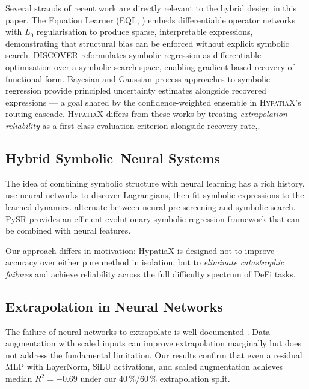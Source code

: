 \documentclass[twoside,11pt]{article}
\newcommand{\Rsq}{R^{2}}
\begin{document}
Several strands of recent work are directly relevant to the hybrid design in
this paper.  The Equation Learner (EQL; \citealt{sahoo2018eql}) embeds
differentiable operator networks with $L_0$ regularisation to produce sparse,
interpretable expressions, demonstrating that structural bias can be enforced
without explicit symbolic search.  DISCOVER \citep{liu2022discover} reformulates
symbolic regression as differentiable optimisation over a symbolic search space,
enabling gradient-based recovery of functional form.  Bayesian and
Gaussian-process approaches to symbolic regression \citep{jin2020bayesian}
provide principled uncertainty estimates alongside recovered expressions ---
a goal shared by the confidence-weighted ensemble in \textsc{HypatiaX}'s
routing cascade.  \textsc{HypatiaX} differs from these works by treating
\emph{extrapolation reliability} as a first-class evaluation criterion
alongside recovery rate,.

\subsection{Hybrid Symbolic--Neural Systems}\label{subsec:hybrid-symbolicneural-systems}
\label{sec:related_hybrid}

The idea of combining symbolic structure with neural learning has a rich history.
\citet{cranmer2020lagrangian} use neural networks to discover Lagrangians, then
fit symbolic expressions to the learned dynamics.  \citet{udrescu2020ai} alternate
between neural pre-screening and symbolic search.  PySR \citep{cranmer2023pysr}
provides an efficient evolutionary-symbolic regression framework that can be
combined with neural features.

Our approach differs in motivation: HypatiaX is designed not to improve accuracy
over either pure method in isolation, but to \emph{eliminate catastrophic failures}
and achieve reliability across the full difficulty spectrum of DeFi tasks.

\subsection{Extrapolation in Neural Networks}\label{subsec:extrapolation-in-neural-networks}
\label{sec:related_extrap}

The failure of neural networks to extrapolate is well-documented \citep{xu2021neural}.
Data augmentation with scaled inputs \citep{lim2021temporal} can improve extrapolation
marginally but does not address the fundamental limitation.  Our results confirm
that even a residual MLP with LayerNorm, SiLU activations, and scaled augmentation
achieves median $\Rsq=-0.69$ under our 40\,\%/60\,\% extrapolation split.
\end{document}
